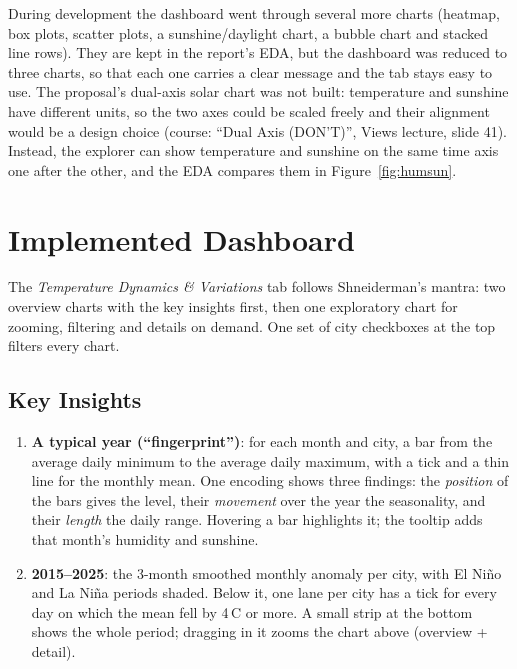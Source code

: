 \documentclass[11pt,a4paper]{article}
\begin{document}
During development the dashboard went through several more charts (heatmap, box plots, scatter plots, a sunshine/daylight chart,
a bubble chart and stacked line rows). They are kept in the report's EDA, but the dashboard was reduced to three charts, so that
each one carries a clear message and the tab stays easy to use. The proposal's dual-axis solar chart was not built: temperature and
sunshine have different units, so the two axes could be scaled freely and their alignment would be a design choice
(course: ``Dual Axis (DON'T)'', Views lecture, slide 41). Instead, the explorer can show temperature and sunshine on the same time
axis one after the other, and the EDA compares them in Figure~\ref{fig:humsun}.

\section{Implemented Dashboard}
The \emph{Temperature Dynamics \& Variations} tab follows Shneiderman's mantra: two overview charts with the key insights first,
then one exploratory chart for zooming, filtering and details on demand. One set of city checkboxes at the top filters every chart.

\subsection*{Key Insights}
\begin{enumerate}
    \item \textbf{A typical year (``fingerprint'')}: for each month and city, a bar from the average daily minimum to the average
    daily maximum, with a tick and a thin line for the monthly mean. One encoding shows three findings: the \emph{position} of the bars
    gives the level, their \emph{movement} over the year the seasonality, and their \emph{length} the daily range.
    Hovering a bar highlights it; the tooltip adds that month's humidity and sunshine.
    \item \textbf{2015--2025}: the 3-month smoothed monthly anomaly per city, with El Niño and La Niña periods shaded.
    Below it, one lane per city has a tick for every day on which the mean fell by 4\,\textdegree C or more.
    A small strip at the bottom shows the whole period; dragging in it zooms the chart above (overview + detail).
\end{enumerate}
\end{document}
